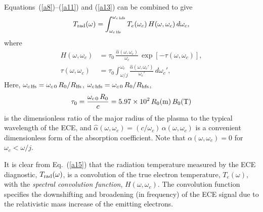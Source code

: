 \documentclass{iopjournal}
\begin{document}
Equations~(\ref{a8})--(\ref{a11}) and (\ref{a13}) can be combined to give
\begin{equation}\label{a15}
T_{\rm rad}(\omega) = \int_{\omega_{c\,{\rm lfs}}}^{\omega_{c\,{\rm hfs}}}T_e(\omega_c)\,H(\omega,\omega_c)\,d\omega_c,
\end{equation}
where
\begin{align}
H(\omega,\omega_c)&=\tau_0\,\frac{\hat{\alpha}(\omega,\omega_c)}{\omega_c}\,\exp\left[-\tau(\omega,\omega_c)\right],\\[0.5ex]
\tau(\omega,\omega_c)&= \tau_0\int_{\omega/j}^{\omega_c}\frac{\hat{\alpha}(\omega,\omega_c')}{\omega_c'}\,d\omega_c',
\end{align}
Here, $\omega_{c\,{\rm lfs}}= \omega_{c\,0}\,R_0/R_{\rm lfs}$,  $\omega_{c\,{\rm hfs}}= \omega_{c\,0}\,R_0/R_{\rm hfs}$, 
\begin{equation}
\tau_0 = \frac{\omega_{c\,0}\,R_0}{c}= 5.97\times 10^2\,R_0({\rm m})\,B_0({\rm T})
\end{equation}
is the dimensionless  ratio of the major radius of the plasma to the typical wavelength of the ECE, and $\hat{\alpha}(\omega,\omega_c) = (c/\omega_c)\,\alpha(\omega,\omega_c)$
is a convenient dimensionless form of the absorption coefficient. Note that $\alpha(\omega,\omega_c)=0$ for $\omega_c<\omega/j$.  

 It is clear from Eq.~(\ref{a15}) that the radiation temperature measured by the ECE diagnostic, $T_{\rm rad}(\omega)$,  is a convolution of the true
electron temperature, $T_e(\omega)$,  with the {\em spectral convolution function}, $H(\omega,\omega_c)$. The convolution function specifies the downshifting and broadening   (in frequency) of the ECE
signal due to the relativistic mass increase of the emitting electrons.
\end{document}
